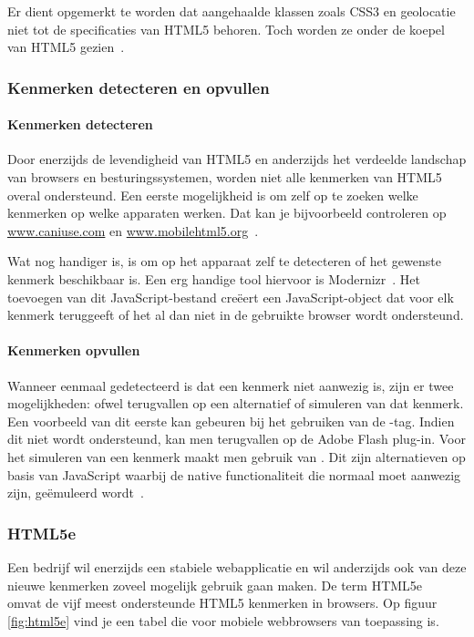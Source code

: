 Er dient opgemerkt te worden dat aangehaalde klassen zoals CSS3 en geolocatie niet tot de specificaties van HTML5 behoren. 
Toch worden ze onder de koepel van HTML5 gezien~\cite{MacDonald2011}.

\subsubsection{Kenmerken detecteren en opvullen}
\paragraph{Kenmerken detecteren}
Door enerzijds de levendigheid van HTML5 en anderzijds het verdeelde landschap van browsers en besturingssystemen, worden niet alle kenmerken van HTML5 overal ondersteund. 
Een eerste mogelijkheid is om zelf op te zoeken welke kenmerken op welke apparaten werken. 
Dat kan je bijvoorbeeld controleren op \url{www.caniuse.com} en \url{www.mobilehtml5.org}~\cite{MacDonald2011}. 

Wat nog handiger is, is om op het apparaat zelf te detecteren of het gewenste kenmerk beschikbaar is. 
Een erg handige tool hiervoor is Modernizr~\cite{Modernizr2012}. 
Het toevoegen van dit JavaScript-bestand creëert een JavaScript-object dat voor elk kenmerk teruggeeft of het al dan niet in de gebruikte browser wordt ondersteund.

\paragraph{Kenmerken opvullen}
Wanneer eenmaal gedetecteerd is dat een kenmerk niet aanwezig is, zijn er twee mogelijkheden: ofwel terugvallen op een alternatief of simuleren van dat kenmerk. 
Een voorbeeld van dit eerste kan gebeuren bij het gebruiken van de -tag. 
Indien dit niet wordt ondersteund, kan men terugvallen op de Adobe Flash plug-in. 
Voor het simuleren van een kenmerk maakt men gebruik van . 
Dit zijn alternatieven op basis van JavaScript waarbij de native functionaliteit die normaal moet aanwezig zijn, geëmuleerd wordt~\cite{MacDonald2011,Weyl2011}.

\subsubsection{HTML5e}
Een bedrijf wil enerzijds een stabiele webapplicatie en wil anderzijds ook van deze nieuwe kenmerken zoveel mogelijk gebruik gaan maken. 
De term HTML5e~\cite{Hales2012} omvat de vijf meest ondersteunde HTML5 kenmerken in browsers. 
Op figuur \ref{fig:html5e} vind je een tabel die voor mobiele webbrowsers van toepassing is.

